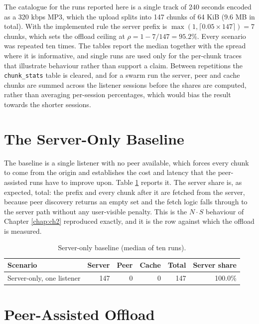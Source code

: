 \par The catalogue for the runs reported here is a single track of 240 seconds encoded as a 320 kbps MP3, which the upload splits into 147 chunks of 64 KiB (9.6 MB in total). With the implemented rule the server prefix is $\max(1, \lceil 0.05 \times 147 \rceil) = 7$ chunks, which sets the offload ceiling at $\rho = 1 - 7/147 = 95.2\%$. Every scenario was repeated ten times. The tables report the median together with the spread where it is informative, and single runs are used only for the per-chunk traces that illustrate behaviour rather than support a claim. Between repetitions the \texttt{chunk\_stats} table is cleared, and for a swarm run the server, peer and cache chunks are summed across the listener sessions before the shares are computed, rather than averaging per-session percentages, which would bias the result towards the shorter sessions.

\section{The Server-Only Baseline}
\label{sec:eval-baseline}

\indent \par The baseline is a single listener with no peer available, which forces every chunk to come from the origin and establishes the cost and latency that the peer-assisted runs have to improve upon. Table \ref{tab:eval-baseline} reports it. The server share is, as expected, total: the prefix and every chunk after it are fetched from the server, because peer discovery returns an empty set and the fetch logic falls through to the server path without any user-visible penalty. This is the $N \cdot S$ behaviour of Chapter \ref{chap:ch2} reproduced exactly, and it is the row against which the offload is measured.

\begin{table}[htbp]
\centering
\begin{tabular}{|l|r|r|r|r|r|}
\hline
\textbf{Scenario} & \textbf{Server} & \textbf{Peer} & \textbf{Cache} & \textbf{Total} & \textbf{Server share} \\
\hline
Server-only, one listener & 147 & 0 & 0 & 147 & 100.0\% \\
\hline
\end{tabular}
\caption{Server-only baseline (median of ten runs).}
\label{tab:eval-baseline}
\end{table}

\section{Peer-Assisted Offload}
\label{sec:eval-offload}

